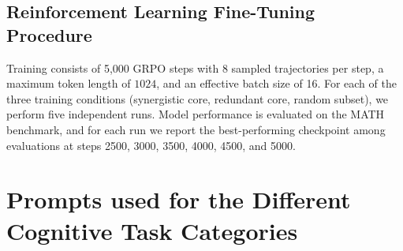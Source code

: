 \documentclass[11pt,a4paper]{ouparticle}
\begin{document}
\subsection*{Reinforcement Learning Fine-Tuning Procedure}\label{sec:rl-procedure}

Training consists of 5{,}000 GRPO steps with 8 sampled trajectories per step, a maximum token length of $1024$, and an effective batch size of 16. For each of the three training conditions (synergistic core, redundant core, random subset), we perform five independent runs. Model performance is evaluated on the MATH benchmark, and for each run we report the best-performing checkpoint among evaluations at steps 2500, 3000, 3500, 4000, 4500, and 5000.



\newpage


\newpage


\appendix

\section{Prompts used for the Different Cognitive Task Categories} \label{appendix:prompts}
\end{document}
